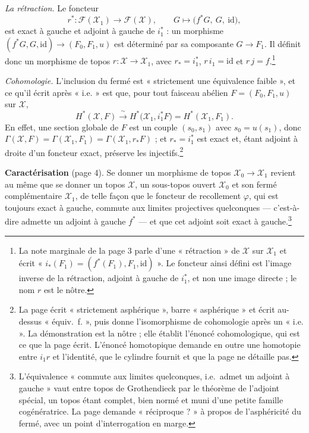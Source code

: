 \documentclass[11pt,a4paper]{article}
\begin{document}
\emph{La rétraction.} Le foncteur
\[
r^{*} : \mathcal{F}(\mathcal{X}_{1}) \to \mathcal{F}(\mathcal{X}),
\qquad G \longmapsto \bigl(f^{*}G,\ G,\ \mathrm{id}\bigr),
\]
est exact à gauche et adjoint à gauche de $i_{1}^{*}$ : un morphisme
$(f^{*}G, G, \mathrm{id}) \to (F_{0}, F_{1}, u)$ est déterminé par sa composante
$G \to F_{1}$. Il définit donc un morphisme de topos
$r : \mathcal{X} \to \mathcal{X}_{1}$, avec $r_{*} = i_{1}^{*}$, $r\, i_{1} =
\mathrm{id}$ et $r\, j = f$.\footnote{La note marginale de la page 3 parle d'une
« rétraction » de $\mathcal{X}$ sur $\mathcal{X}_{1}$ et écrit
« $i_{*}(F_{1}) = (f^{*}(F_{1}), F_{1}, \mathrm{id})$ ». Le foncteur ainsi défini
est l'image inverse de la rétraction, adjoint à gauche de $i_{1}^{*}$, et non
une image directe ; le nom $r$ est le nôtre.}

\emph{Cohomologie.} L'inclusion du fermé est « strictement une équivalence
faible », et ce qu'il écrit après « i.e. » est que, pour tout faisceau abélien $F = (F_{0}, F_{1}, u)$ sur
$\mathcal{X}$,
\[
H^{*}(\mathcal{X}, F) \xrightarrow{\;\sim\;} H^{*}\bigl(\mathcal{X}_{1},
i_{1}^{*}F\bigr) = H^{*}(\mathcal{X}_{1}, F_{1}).
\]
En effet, une section globale de $F$ est un couple $(s_{0}, s_{1})$ avec
$s_{0} = u(s_{1})$, donc $\Gamma(\mathcal{X}, F) = \Gamma(\mathcal{X}_{1}, F_{1})
= \Gamma(\mathcal{X}_{1}, r_{*}F)$ ; et $r_{*} = i_{1}^{*}$ est exact et, étant
adjoint à droite d'un foncteur exact, préserve les injectifs.\footnote{La page
écrit « strictement asphérique », barre « asphérique » et écrit au-dessus
« équiv.\ f. », puis donne l'isomorphisme de cohomologie après un « i.e. ». La
démonstration est la nôtre ; elle établit l'énoncé cohomologique, qui est ce
que la page écrit. L'énoncé homotopique demande en outre une homotopie entre
$i_{1} r$ et l'identité, que le cylindre fournit et que la page ne détaille
pas.}

\textbf{Caractérisation} (page 4). Se donner un morphisme de topos
$\mathcal{X}_{0} \to \mathcal{X}_{1}$ revient au même que se donner un topos
$\mathcal{X}$, un sous-topos ouvert $\mathcal{X}_{0}$ et son fermé complémentaire
$\mathcal{X}_{1}$, de telle façon que le foncteur de recollement $\varphi$, qui
est toujours exact à gauche, commute aux limites projectives quelconques ---
c'est-à-dire admette un adjoint à gauche $f^{*}$ --- et que cet adjoint soit
exact à gauche.\footnote{L'équivalence « commute aux limites quelconques,
i.e.\ admet un adjoint à gauche » vaut entre topos de Grothendieck par le
théorème de l'adjoint spécial, un topos étant complet, bien normé et muni d'une
petite famille cogénératrice. La page demande « réciproque ? » à propos de
l'asphéricité du fermé, avec un point d'interrogation en marge.}
\end{document}
